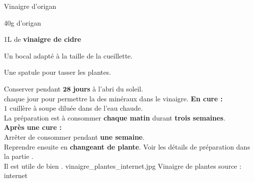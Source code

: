 \ficherecette
{%
    Vinaigre d'origan
}
{%
    \item 40g d'origan
    \item 1L de \textbf{vinaigre de cidre}
}
{%
    \item Un bocal adapté à la taille de la cueillette.
    \item Une spatule pour tasser les plantes.

}
{%
    Conserver pendant $\mathbf{28}$ \textbf{jours} à l'abri du soleil. \\
     chaque jour pour permettre la  des minéraux dans le vinaigre.
}
{%
    \textbf{En cure :}\\
    $1$ cuillère à soupe diluée dans de l'eau chaude.\\
    La préparation est à consommer \textbf{chaque matin} durant \textbf{trois semaines}.\\

    \textbf{Après une cure :}\\
    Arrêter de consommer pendant \textbf{une semaine}. \\
    Reprendre ensuite en \textbf{changeant de plante}.
}
{%
    Voir les détails de préparation dans la partie .\\

    Il est utile de bien .
}
{%
    vinaigre_plantes_internet.jpg
}
{%
    Vinaigre de plantes
}
{%
    source : internet
}